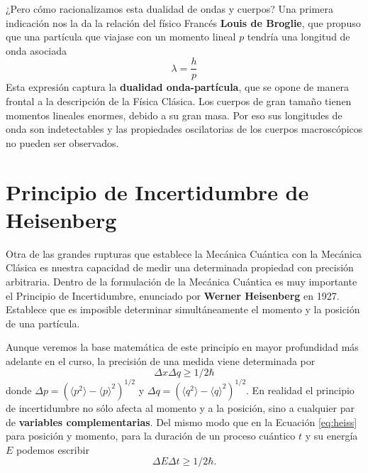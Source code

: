 \documentclass{tufte-handout}
\begin{document}
¿Pero cómo racionalizamos esta dualidad de ondas y cuerpos?
Una primera indicación nos la da la relación del físico Francés
\textbf{Louis de Broglie}, que propuso que una partícula que viajase
con un momento lineal $p$ tendría una longitud de onda 
asociada
\begin{equation}
\lambda=\frac{h}{p}\label{eq:debroglie}
\end{equation}
Esta expresión captura la \textbf{dualidad onda-partícula},
que se opone de manera frontal a la descripción de la Física 
Clásica.
Los cuerpos de gran tamaño tienen momentos lineales enormes, debido
a su gran masa. Por eso sus longitudes de onda son indetectables
y las propiedades oscilatorias de los cuerpos macroscópicos no 
pueden ser observados.	

\section{Principio de Incertidumbre de Heisenberg}
Otra de las grandes rupturas que establece la Mecánica Cuántica 
con la Mecánica Clásica es nuestra capacidad de medir una 
determinada propiedad con precisión arbitraria. Dentro de la 
formulación de la Mecánica Cuántica es muy importante el Principio
de Incertidumbre, enunciado por \textbf{Werner Heisenberg} en 
1927. 
Establece que es imposible determinar simultáneamente el momento 
y la posición de una partícula. 

Aunque veremos la base matemática de 
este principio en 
mayor profundidad más adelante en el curso, la precisión de una
medida viene determinada por
\begin{equation}
    \Delta x\Delta q\geq 1/2\hbar\label{eq:heiss}
\end{equation}
donde $\Delta p=(\langle p^2\rangle-\langle p \rangle^2)^{1/2}$ y
$\Delta q=(\langle q^2\rangle-\langle q\rangle^2)^{1/2}$. En realidad
el principio de incertidumbre no sólo afecta al momento y a la posición, sino a 
cualquier par de \textbf{variables complementarias}. Del mismo modo
que en la Ecuación \ref{eq:heiss} para posición y momento, para 
la duración de un proceso cuántico $t$ y su energía $E$ podemos
escribir
\begin{equation}
    \Delta E\Delta t\geq 1/2\hbar.
\end{equation}
\end{document}

